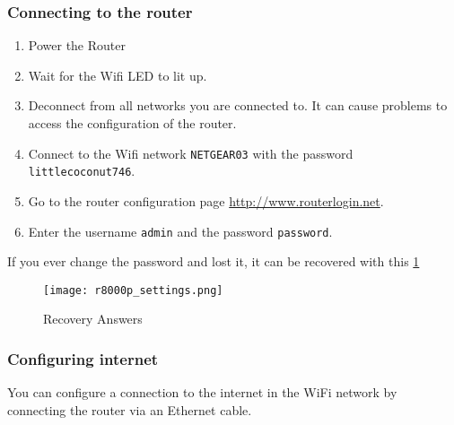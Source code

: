             \subsubsection{Connecting to the router}
                \begin{enumerate}
                    \item Power the Router
                    \item Wait for the Wifi LED to lit up.
                    \item Deconnect from all networks you are connected to. It can cause problems to access the configuration of the router.
                    \item Connect to the Wifi network \texttt{NETGEAR03} with the password \texttt{littlecoconut746}.
                    \item Go to the router configuration page \url{http://www.routerlogin.net}.
                    \item Enter the username \texttt{admin} and the password \texttt{password}.
                \end{enumerate}
                
                If you ever change the password and lost it, it can be recovered with this \ref{fig:r8000p_settings}
                
                \begin{figure}[!ht]
                    \centering
                    \texttt{[image: r8000p\_settings.png]}
                    \caption{Recovery Answers}
                    \label{fig:r8000p_settings}
                \end{figure}
                
                

            \subsubsection{Configuring internet}
                You can configure a connection to the internet in the WiFi network by connecting the router via an Ethernet cable.
                
